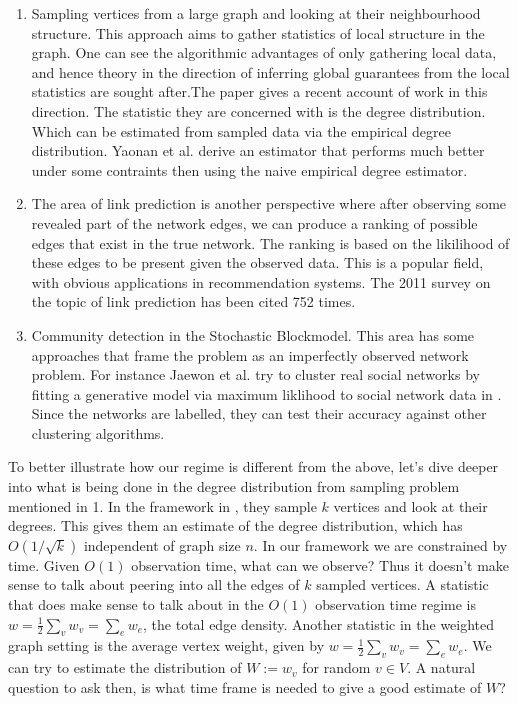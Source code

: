 \begin{enumerate}
    \item Sampling vertices from a large graph and looking at their neighbourhood structure.  This approach aims to gather statistics of local structure in the graph.  One can see the algorithmic advantages of only gathering local data, and hence theory in the direction of inferring global guarantees from the local statistics are sought after.The paper \cite{Yaonan} gives a recent account of work in this direction.  The statistic they are concerned with is the degree distribution.  Which can be estimated from sampled data via the empirical degree distribution.  Yaonan et al. derive an estimator that performs much better under some contraints then using the naive empirical degree estimator.
    \item The area of link prediction is another perspective where after observing some revealed part of the network edges, we can produce a ranking of possible edges that exist in the true network. The ranking is based on the likilihood of these edges to be present given the observed data. This is a popular field, with obvious applications in recommendation systems.  The 2011 survey  \cite{link} on the topic of link prediction has been cited 752 times.
    \item Community detection in the Stochastic Blockmodel.  This area has some approaches that frame the problem as an imperfectly observed network problem.  For instance Jaewon et al. try to cluster real social networks by fitting a generative model via maximum liklihood to social network data in \cite{JureJaewon_overlapping_com}.  Since the networks are labelled, they can test their accuracy against other clustering algorithms. 
\end{enumerate}

To better illustrate how our regime is different from the above, let's dive deeper into what is being done in the degree distribution from sampling problem mentioned in 1.  In the framework in \cite{Yaonan}, they sample $k$ vertices and look at their degrees.  This gives them an estimate of the degree distribution, which has $O(1/\sqrt{k})$ independent of graph size $n$.  In our framework we are constrained by time.  Given $O(1)$ observation time, what can we observe?  Thus it doesn't make sense to talk about peering into all the edges of $k$ sampled vertices. A statistic that does make sense to talk about in the $O(1)$ observation time  regime is $w = \frac{1}{2}\sum_v w_v = \sum_e w_e$, the total edge density.  Another statistic in the weighted graph setting is the average vertex weight, given by $w = \frac{1}{2}\sum_v w_v = \sum_e w_e$.  We can try to estimate the distribution of $W := w_v$ for random $v \in V$.  A natural question to ask then, is what time frame is needed to give a good estimate of $W$?  

